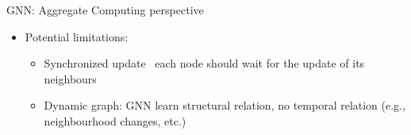 \documentclass[presentation, 9pt]{beamer}\mode<presentation>{\usetheme{AMSBolognaFC}}
\begin{document}
\begin{frame}{GNN: Aggregate Computing perspective}
\begin{itemize}
\begin{itemize}
				\item Train a GNN on the gathered graphs
				\item `Deploy' the GNN on the aggregate systems
				\begin{itemize}
					\item Each node executes the GNN locally sharing the same parameters (homogenous behaviour)
				\end{itemize}
			\end{itemize}
			\item Potential limitations:
			\begin{itemize}
				\item Synchronized update \faArrowRight \, each node should wait for the update of its neighbours
				\item Dynamic graph: GNN learn structural relation, no temporal relation (e.g., neighbourhood changes, etc.)
			\end{itemize}
		\end{itemize}
\end{frame}
\end{document}
